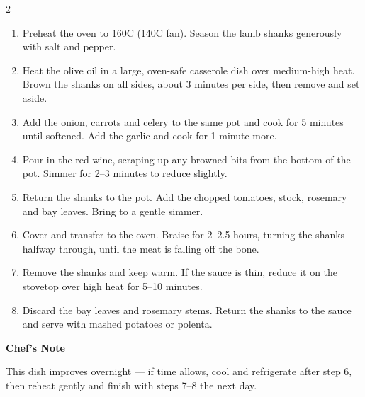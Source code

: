 \documentclass[a4paper,11pt]{article}
\begin{document}
\begin{paracol}{2}
  \begin{enumerate}[leftmargin=1.6em, itemsep=6pt,
                     label={\color{accent}\bfseries\arabic*.}]
    \item Preheat the oven to 160\textdegree C (140\textdegree C fan).
      Season the lamb shanks generously with salt and pepper.
    \item Heat the olive oil in a large, oven-safe casserole dish over
      medium-high heat. Brown the shanks on all sides, about 3 minutes per
      side, then remove and set aside.
    \item Add the onion, carrots and celery to the same pot and cook for 5
      minutes until softened. Add the garlic and cook for 1 minute more.
    \item Pour in the red wine, scraping up any browned bits from the
      bottom of the pot. Simmer for 2--3 minutes to reduce slightly.
    \item Return the shanks to the pot. Add the chopped tomatoes, stock,
      rosemary and bay leaves. Bring to a gentle simmer.
    \item Cover and transfer to the oven. Braise for 2--2.5 hours, turning
      the shanks halfway through, until the meat is falling off the bone.
    \item Remove the shanks and keep warm. If the sauce is thin, reduce it
      on the stovetop over high heat for 5--10 minutes.
    \item Discard the bay leaves and rosemary stems. Return the shanks to
      the sauce and serve with mashed potatoes or polenta.
  \end{enumerate}

  \vspace{1em}
  {\color{accent}\bfseries Chef's Note}
  \vspace{0.4em}

  This dish improves overnight --- if time allows, cool and refrigerate
  after step 6, then reheat gently and finish with steps 7--8 the next day.

\end{paracol}
\end{document}
